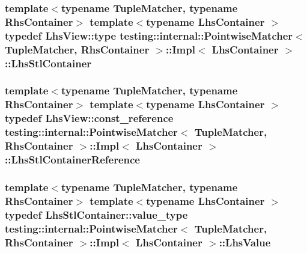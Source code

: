 \subsubsection[{\texorpdfstring{Lhs\+Stl\+Container}{LhsStlContainer}}]{\setlength{\rightskip}{0pt plus 5cm}template$<$typename Tuple\+Matcher, typename Rhs\+Container$>$ template$<$typename Lhs\+Container $>$ typedef {\bf Lhs\+View\+::type} {\bf testing\+::internal\+::\+Pointwise\+Matcher}$<$ Tuple\+Matcher, Rhs\+Container $>$\+::{\bf Impl}$<$ Lhs\+Container $>$\+::{\bf Lhs\+Stl\+Container}}\hypertarget{classtesting_1_1internal_1_1_pointwise_matcher_1_1_impl_a23420b57b4cd6d83cec8afda746c27f2}{}\label{classtesting_1_1internal_1_1_pointwise_matcher_1_1_impl_a23420b57b4cd6d83cec8afda746c27f2}
\subsubsection[{\texorpdfstring{Lhs\+Stl\+Container\+Reference}{LhsStlContainerReference}}]{\setlength{\rightskip}{0pt plus 5cm}template$<$typename Tuple\+Matcher, typename Rhs\+Container$>$ template$<$typename Lhs\+Container $>$ typedef {\bf Lhs\+View\+::const\+\_\+reference} {\bf testing\+::internal\+::\+Pointwise\+Matcher}$<$ Tuple\+Matcher, Rhs\+Container $>$\+::{\bf Impl}$<$ Lhs\+Container $>$\+::{\bf Lhs\+Stl\+Container\+Reference}}\hypertarget{classtesting_1_1internal_1_1_pointwise_matcher_1_1_impl_a9df3eb0866f76d59dbdd35fafeb5590c}{}\label{classtesting_1_1internal_1_1_pointwise_matcher_1_1_impl_a9df3eb0866f76d59dbdd35fafeb5590c}
\subsubsection[{\texorpdfstring{Lhs\+Value}{LhsValue}}]{\setlength{\rightskip}{0pt plus 5cm}template$<$typename Tuple\+Matcher, typename Rhs\+Container$>$ template$<$typename Lhs\+Container $>$ typedef Lhs\+Stl\+Container\+::value\+\_\+type {\bf testing\+::internal\+::\+Pointwise\+Matcher}$<$ Tuple\+Matcher, Rhs\+Container $>$\+::{\bf Impl}$<$ Lhs\+Container $>$\+::{\bf Lhs\+Value}}\hypertarget{classtesting_1_1internal_1_1_pointwise_matcher_1_1_impl_a453769e721f4212e399f76c980b4b65c}{}\label{classtesting_1_1internal_1_1_pointwise_matcher_1_1_impl_a453769e721f4212e399f76c980b4b65c}
